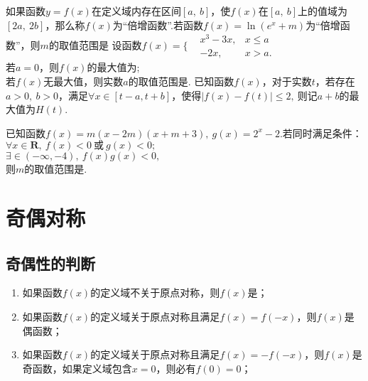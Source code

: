 \documentclass{BHCexam}
\begin{document}
\begin{questions}
\qs 如果函数$y=f(x)$在定义域内存在区间$ \left[a,~b\right] $，使$f(x)$在$ \left[a,~b\right] $上的值域为$ \left[2a,~2b\right] $，那么称$f(x)$为“倍增函数”.若函数$ f(x)=\ln (e^x+m) $为“倍增函数”，则$ m $的取值范围是\xx
{}
\qs 设函数$f(x)=\Bigg\{\begin{aligned}
&x^3-3x,&x\le a \\
&-2x,&x>a.
\end{aligned}$\\
 若$ a=0 $，则$f(x)$的最大值为\tk;\\
 若$f(x)$无最大值，则实数$ a $的取值范围是\tk.
\qs 已知函数$f(x)$，对于实数$ t $，若存在$ a>0,~b>0$，满足$ \forall x\in [t-a,t+b] $，使得$ \left|f(x)-f(t)\right|\le 2,~ $则记$ a+b $的最大值为$ H(t) .$
\qs 已知函数$f(x)=m(x-2m)(x+m+3),~g(x)=2^x-2.$若同时满足条件：\\
 $ \forall x \in \mathbf{R} ,~f(x)<0~\text{或}~g(x)<0;$\\
 $ \exists \in (-\infty,-4),~f(x)g(x)<0, $\\
则$ m $的取值范围是\tk.
\end{questions}
\newpage


\section{奇偶对称}
\subsection{奇偶性的判断}
\begin{enumerate}[1)]
\item 如果函数$f(x)$的定义域不关于原点对称，则$f(x)$是；
\item 如果函数$f(x)$的定义域关于原点对称且满足$ f(x)=f(-x) $，则$f(x)$是偶函数；
\item 如果函数$f(x)$的定义域关于原点对称且满足$ f(x)=-f(-x) $，则$f(x)$是奇函数，如果定义域包含$ x=0 $，则必有$ f(0)=0 $；
\end{enumerate}
\end{document}
